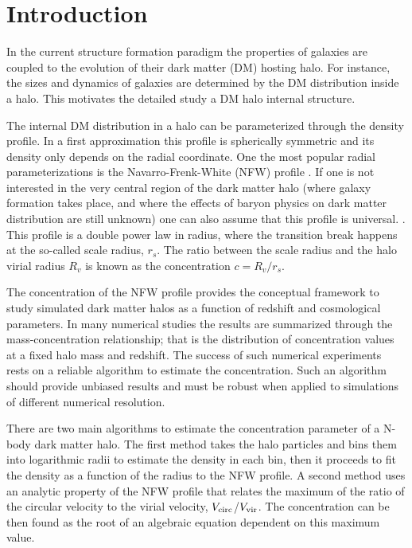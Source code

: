 \documentclass[a4,useAMS,usenatbib,usegraphicx]{mn2e}
\begin{document}
\section{Introduction}
\label{sec:introduction}
In the current structure formation paradigm the properties of galaxies
are coupled to the evolution of their dark matter (DM) hosting halo.
For instance, the sizes and dynamics of galaxies are determined by
the DM distribution inside a halo. This motivates the detailed study
a DM halo internal structure. 

The internal DM distribution in a halo can be parameterized through the density
profile.  
In a first approximation this profile is spherically symmetric and
its density only depends on the radial coordinate. 
One the most popular radial parameterizations is the
Navarro-Frenk-White (NFW) profile 
\citep{NFW}.   
If one is not interested in the very central region of the
dark matter halo (where galaxy formation takes place, and where the
effects of baryon physics on dark matter distribution are still 
unknown) one can also assume that this profile is universal.
\citep{Navarro2010}.  
 This profile is a double power law in radius, where the transition
break happens at the so-called scale radius, $r_s$.  
The ratio between the scale radius and the halo virial radius $R_v$ is
known as the concentration $c=R_v/r_s$. 


The concentration of the NFW profile provides the conceptual
framework to study simulated dark matter halos as a function of
redshift and cosmological parameters.
In many numerical studies 
\citep{Neto2007,Maccio2008,Duffy2008,Munoz2011,Prada2012,Ludlow2014} 
the results are summarized through the
mass-concentration relationship; that is the distribution of
concentration values at a fixed halo mass and redshift.
The success of such numerical experiments rests on a
reliable algorithm to estimate the concentration. 
Such an algorithm should provide unbiased results and must be robust
when applied to simulations of different numerical resolution.  

There are two main algorithms to estimate the concentration parameter
of a N-body dark matter halo. 
The first method takes the halo particles and bins them into
logarithmic radii to estimate the density in each bin, then it 
proceeds to fit the density as a function of the radius to the NFW
profile.  
A second method uses an analytic property of the NFW profile
that relates the maximum of the ratio of the circular velocity to the
virial velocity, $V_{\rm circ}$/$V_{\rm vir}$.  The concentration can
be then found as the root of an algebraic equation dependent on this
maximum value.  
\end{document}
